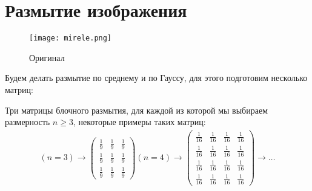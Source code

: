 \chapter{Размытие изображения}
\label{ch:chap2}


\lstset{style=mystyle}

\begin{figure}[ht]
    \centering
    \texttt{[image: mirele.png]}
	\caption{Оригинал}
\end{figure}

Будем делать размытие по среднему и по Гауссу, для этого подготовим несколько матриц:

Три матрицы блочного размытия, для каждой из которой мы выбираем размерность $n \geq 3$, некоторые примеры таких матриц:
$$
\begin{aligned}
    (n=3)\rightarrow\begin{pmatrix}
        \frac{1}{9} & \frac{1}{9} & \frac{1}{9}\\
        \frac{1}{9} & \frac{1}{9} & \frac{1}{9}\\
        \frac{1}{9} & \frac{1}{9} & \frac{1}{9} 
    \end{pmatrix}
    (n=4)\rightarrow\begin{pmatrix}
        \frac{1}{16} & \frac{1}{16} & \frac{1}{16} & \frac{1}{16} \\
        \frac{1}{16} & \frac{1}{16} & \frac{1}{16} & \frac{1}{16} \\
        \frac{1}{16} & \frac{1}{16} & \frac{1}{16} & \frac{1}{16} \\
        \frac{1}{16} & \frac{1}{16} & \frac{1}{16} & \frac{1}{16} 
    \end{pmatrix}
    \rightarrow\dots
\end{aligned}
$$


